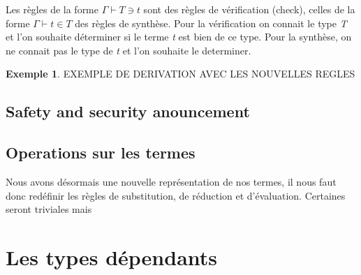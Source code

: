 \documentclass {article}
\theoremstyle{definition}
\newtheorem{example}{Exemple}
\theoremstyle{remark}
\begin{document}
Les règles de la forme \(\Gamma\vdash T \ni t\) sont des règles de vérification (check),
celles de la forme \(\Gamma\vdash t \in T\) des règles de synthèse.
Pour la vérification on connait le type \emph{T} et l'on souhaite déterminer si le terme \emph{t}
est bien de ce type. Pour la synthèse, on ne connait pas le type de \emph{t} et l'on souhaite le
determiner.

\begin{example}
EXEMPLE DE DERIVATION AVEC LES NOUVELLES REGLES
\end{example}

\subsection{Safety and security anouncement}

\subsection{Operations sur les termes}

Nous avons désormais une nouvelle représentation de nos termes, il nous faut donc 
redéfinir les règles de substitution, de réduction et d'évaluation.
Certaines seront triviales mais 


\section{Les types dépendants}







\end{document}
